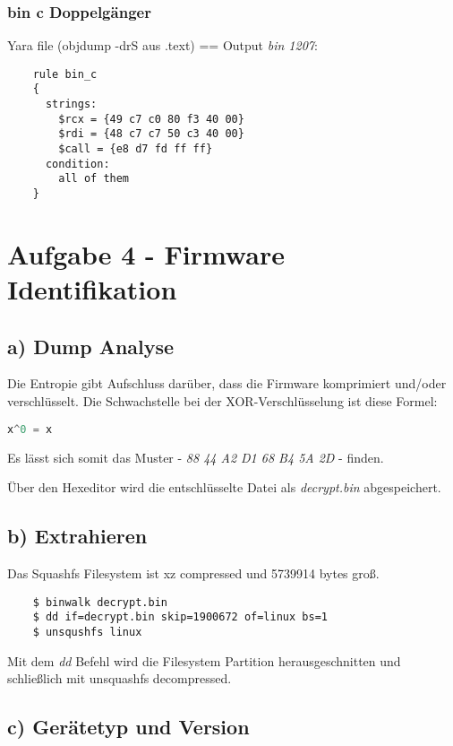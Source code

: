 \subsubsection*{bin c Doppelgänger}

Yara file (objdump -drS aus .text) == Output \textit{bin 1207}:

\begin{lstlisting}
    rule bin_c
    {
      strings:
        $rcx = {49 c7 c0 80 f3 40 00}
        $rdi = {48 c7 c7 50 c3 40 00}
        $call = {e8 d7 fd ff ff}
      condition:
        all of them
    }

\end{lstlisting}

\section*{Aufgabe 4 - Firmware Identifikation}

\subsection*{a) Dump Analyse}

Die Entropie gibt Aufschluss darüber, dass die Firmware komprimiert und/oder verschlüsselt.
Die Schwachstelle bei der XOR-Verschlüsselung ist diese Formel:
\begin{lstlisting}[language=Python]
    x^0 = x
\end{lstlisting}

Es lässt sich somit das Muster - \textit{88 44 A2 D1 68 B4 5A 2D} - finden.

Über den Hexeditor wird die entschlüsselte Datei als \textit{decrypt.bin} abgespeichert.

\subsection*{b) Extrahieren}

Das Squashfs Filesystem ist xz compressed und 5739914 bytes groß.
\begin{lstlisting}
    $ binwalk decrypt.bin
    $ dd if=decrypt.bin skip=1900672 of=linux bs=1
    $ unsqushfs linux
\end{lstlisting}

Mit dem \textit{dd} Befehl wird die Filesystem Partition herausgeschnitten und schließlich mit unsquashfs decompressed.

\subsection*{c) Gerätetyp und Version}

